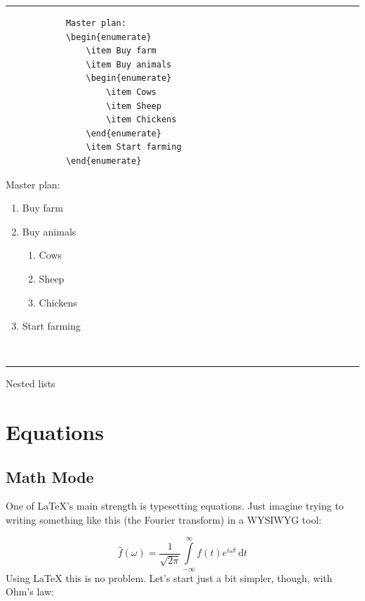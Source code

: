 {\begin{listing}
	\rule{\textwidth}{0.4pt}
	\begin{minipage}[t]{0.49\textwidth}
		\begin{verbatim}
			Master plan:
			\begin{enumerate}
				\item Buy farm
				\item Buy animals
				\begin{enumerate}
					\item Cows
					\item Sheep
					\item Chickens
				\end{enumerate}
				\item Start farming
			\end{enumerate}	
		\end{verbatim}
	\end{minipage}\hfill\vline\hfill
	\begin{minipage}[t]{0.49\textwidth}
			Master plan:
			\begin{enumerate}
				\item Buy farm
				\item Buy animals
				\begin{enumerate}
					\item Cows
					\item Sheep
					\item Chickens
				\end{enumerate}
				\item Start farming
			\end{enumerate}							
	\end{minipage}\\[0.5em]
	\rule{\textwidth}{0.4pt}
	\caption{Nested lists}
	\label{lst:latex:nestedlists}
\end{listing}

\section{Equations}\label{sec:latex:equations}

\subsection{Math Mode}
One of \LaTeX{}'s main strength is typesetting equations. Just imagine trying to writing something like this (the Fourier transform) in a WYSIWYG tool:

\begin{equation}
	\hat{f}(\omega)=\frac{1}{\sqrt{2\pi}}
	\int\limits_{-\infty}^\infty f(t)e^{i\omega t} \,\mathrm{d}t
	\label{eq:latex:fourier}
\end{equation}
\noindent Using \LaTeX{} this is no problem. Let's start just a bit simpler, though, with Ohm's law:

}
